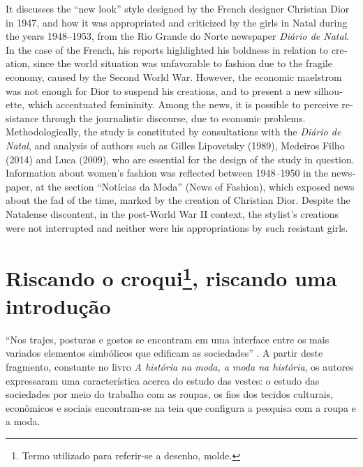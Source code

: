 \begin{refsection}
\begin{otherlanguage}{english}
    \begin{galoResumo}[Abstract]
        It discusses the ``new look'' style designed by the French designer Christian Dior in 1947, and how it was appropriated and criticized by the girls in Natal during the years 1948--1953, from the Rio Grande do Norte newspaper \textit{Diário de Natal}. In the case of the French, his reports highlighted his boldness in relation to creation, since the world situation was unfavorable to fashion due to the fragile economy, caused by the Second World War. However, the economic maelstrom was not enough for Dior to suspend his creations, and to present a new silhouette, which accentuated femininity. Among the news, it is possible to perceive resistance through the journalistic discourse, due to economic problems. Methodologically, the study is constituted by consultations with the \textit{Diário de Natal}, and analysis of authors such as Gilles Lipovetsky (1989), Medeiros Filho (2014) and Luca (2009), who are essential for the design of the study in question. Information about women's fashion was reflected between 1948--1950 in the newspaper, at the section ``Notícias da Moda'' (News of Fashion), which exposed news about the fad of the time, marked by the creation of Christian Dior. Despite the Natalense discontent, in the post-World War II context, the stylist's creations were not interrupted and neither were his appropriations by such resistant girls. 
    \end{galoResumo}
    
    \end{otherlanguage}

    \section[Riscando o croqui, riscando uma introdução]{Riscando o croqui\footnote{Termo utilizado para referir-se a desenho, molde.}, riscando uma introdução}

    ``Nos trajes, posturas e gostos se encontram em uma interface entre os mais variados elementos simbólicos que edificam as sociedades'' \cite[p.~14]{SilvaMonteleoneDebom2019HistoriaModa}. A partir deste fragmento, constante no livro \textit{A história na moda, a moda na história}, os autores expressaram uma característica acerca do estudo das vestes: o estudo das sociedades por meio do trabalho com as roupas, os fios dos tecidos culturais, econômicos e sociais encontram-se na teia que configura a pesquisa com a roupa e a moda.  


\end{refsection}
